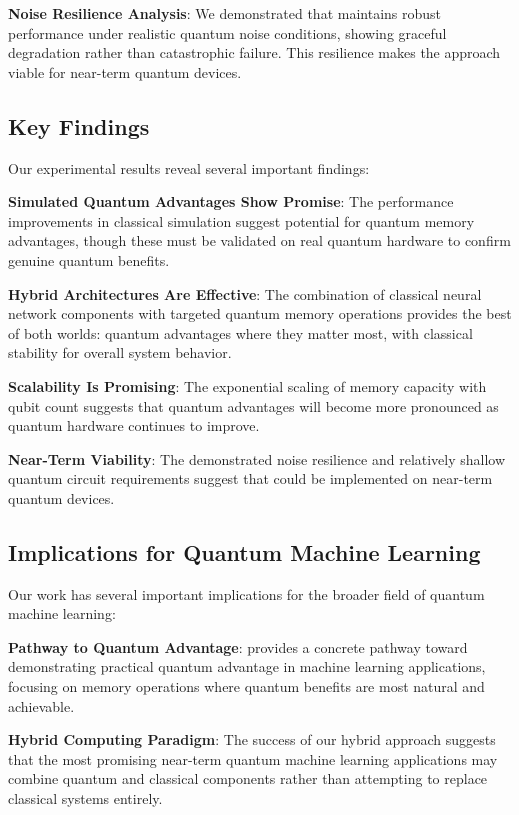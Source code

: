 \textbf{Noise Resilience Analysis}: We demonstrated that \qmnn maintains robust performance under realistic quantum noise conditions, showing graceful degradation rather than catastrophic failure. This resilience makes the approach viable for near-term quantum devices.

\subsection{Key Findings}

Our experimental results reveal several important findings:

\textbf{Simulated Quantum Advantages Show Promise}: The performance improvements in classical simulation suggest potential for quantum memory advantages, though these must be validated on real quantum hardware to confirm genuine quantum benefits.

\textbf{Hybrid Architectures Are Effective}: The combination of classical neural network components with targeted quantum memory operations provides the best of both worlds: quantum advantages where they matter most, with classical stability for overall system behavior.

\textbf{Scalability Is Promising}: The exponential scaling of memory capacity with qubit count suggests that quantum advantages will become more pronounced as quantum hardware continues to improve.

\textbf{Near-Term Viability}: The demonstrated noise resilience and relatively shallow quantum circuit requirements suggest that \qmnn could be implemented on near-term quantum devices.

\subsection{Implications for Quantum Machine Learning}

Our work has several important implications for the broader field of quantum machine learning:

\textbf{Pathway to Quantum Advantage}: \qmnn provides a concrete pathway toward demonstrating practical quantum advantage in machine learning applications, focusing on memory operations where quantum benefits are most natural and achievable.

\textbf{Hybrid Computing Paradigm}: The success of our hybrid approach suggests that the most promising near-term quantum machine learning applications may combine quantum and classical components rather than attempting to replace classical systems entirely.

